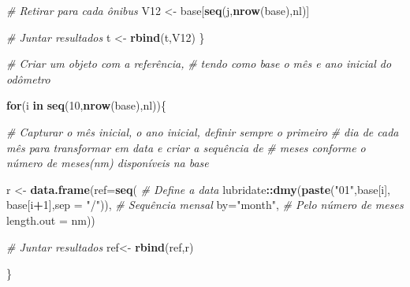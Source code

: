 \documentclass[12pt,a4paper]{article}
\newenvironment{Shaded}{\begin{snugshade}}{\end{snugshade}}
\newcommand{\CommentTok}[1]{\textcolor[rgb]{0.56,0.35,0.01}{\textit{#1}}}
\newcommand{\ControlFlowTok}[1]{\textcolor[rgb]{0.13,0.29,0.53}{\textbf{#1}}}
\newcommand{\DataTypeTok}[1]{\textcolor[rgb]{0.13,0.29,0.53}{#1}}
\newcommand{\DecValTok}[1]{\textcolor[rgb]{0.00,0.00,0.81}{#1}}
\newcommand{\KeywordTok}[1]{\textcolor[rgb]{0.13,0.29,0.53}{\textbf{#1}}}
\newcommand{\NormalTok}[1]{#1}
\newcommand{\OperatorTok}[1]{\textcolor[rgb]{0.81,0.36,0.00}{\textbf{#1}}}
\newcommand{\StringTok}[1]{\textcolor[rgb]{0.31,0.60,0.02}{#1}}
\begin{document}
\begin{Shaded}
\begin{Highlighting}[]
    
    \CommentTok{# Retirar para cada ônibus}
\NormalTok{    V12 <-}\StringTok{ }\NormalTok{base[}\KeywordTok{seq}\NormalTok{(j,}\KeywordTok{nrow}\NormalTok{(base),nl)]}
    
    \CommentTok{# Juntar resultados}
\NormalTok{    t <-}\StringTok{ }\KeywordTok{rbind}\NormalTok{(t,V12)}
\NormalTok{\}}

\CommentTok{# Criar um objeto com a referência,}
\CommentTok{# tendo como base o mês e ano inicial do odômetro}

  
  \ControlFlowTok{for}\NormalTok{(i }\ControlFlowTok{in} \KeywordTok{seq}\NormalTok{(}\DecValTok{10}\NormalTok{,}\KeywordTok{nrow}\NormalTok{(base),nl))\{}
    
    \CommentTok{# Capturar o mês inicial, o ano inicial, definir sempre o primeiro}
    \CommentTok{# dia de cada mês para transformar em data e criar a sequência de }
    \CommentTok{# meses conforme o número de meses(nm) disponíveis na base}
    
\NormalTok{    r <-}\StringTok{ }\KeywordTok{data.frame}\NormalTok{(}\DataTypeTok{ref=}\KeywordTok{seq}\NormalTok{(}
      \CommentTok{# Define a data}
\NormalTok{      lubridate}\OperatorTok{::}\KeywordTok{dmy}\NormalTok{(}\KeywordTok{paste}\NormalTok{(}\StringTok{"01"}\NormalTok{,base[i],}
\NormalTok{                           base[i}\OperatorTok{+}\DecValTok{1}\NormalTok{],}\DataTypeTok{sep =} \StringTok{"/"}\NormalTok{)),}
      \CommentTok{# Sequência mensal}
      \DataTypeTok{by=}\StringTok{"month"}\NormalTok{,}
      \CommentTok{# Pelo número de meses}
      \DataTypeTok{length.out =}\NormalTok{ nm))}
  
    \CommentTok{# Juntar resultados}
\NormalTok{    ref<-}\StringTok{ }\KeywordTok{rbind}\NormalTok{(ref,r)}
  
\NormalTok{\}}


\end{Highlighting}
\end{Shaded}
\end{document}
